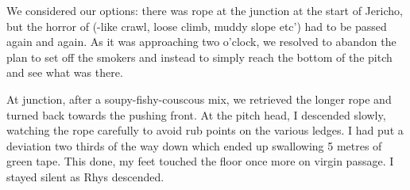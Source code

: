 We considered our options: there was rope at the junction at the start of Jericho, but the horror of  (-like crawl, loose climb, muddy slope etc') had to be passed again and again.  As it was approaching two o'clock, we resolved to abandon the plan to set off the smokers and  instead to simply reach the bottom of the pitch and see what was there.

At  junction, after a soupy-fishy-couscous mix, we retrieved the longer rope and turned back towards the pushing front. At the pitch head, I descended slowly, watching the rope carefully to avoid rub points on the various ledges. I had put a deviation two thirds of the way down which ended up swallowing 5 metres of green tape. This done, my feet touched the floor once more on virgin passage. I stayed silent as Rhys descended.

